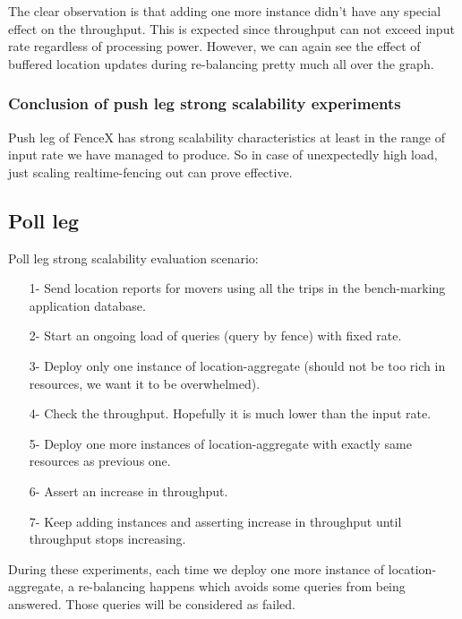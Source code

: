 \documentclass[a4]{report}
\begin{document}
    The clear observation is that adding one more instance didn't have any special effect on the throughput.
    This is expected since throughput can not exceed input rate regardless of processing power.
    However, we can again see the effect of buffered location updates during re-balancing pretty much all over the
    graph.

    \subsubsection{Conclusion of push leg strong scalability experiments}
    Push leg of FenceX has strong scalability characteristics at least in the range of input rate we have managed to produce.
    So in case of unexpectedly high load, just scaling realtime-fencing out can prove effective.

    \subsection{Poll leg}
    Poll leg strong scalability evaluation scenario:
    \begin{itemize}
        \item[1-] Send location reports for movers using all the trips in the bench-marking application database.
        \item[2-] Start an ongoing load of queries (query by fence) with fixed rate.
        \item[3-] Deploy only one instance of location-aggregate (should not be too rich in resources, we want it to be
        overwhelmed).
        \item[4-] Check the throughput. Hopefully it is much lower than the input rate.
        \item[5-] Deploy one more instances of location-aggregate with exactly same resources as previous one.
        \item[6-] Assert an increase in throughput.
        \item[7-] Keep adding instances and asserting increase in throughput until throughput stops increasing.
    \end{itemize}

    During these experiments, each time we deploy one more instance of location-aggregate, a re-balancing happens which
    avoids some queries from being answered.
    Those queries will be considered as failed.

    \clearpage
\end{document}
